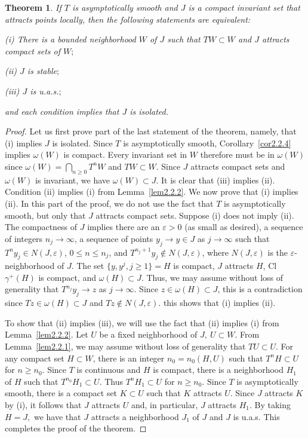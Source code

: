 \documentclass{surv-l}
\theoremstyle{plain}
\newtheorem{theorem}{Theorem}[section]
\theoremstyle{definition}
\numberwithin{equation}{section}
\numberwithin{figure}{chapter}
\begin{document}
\begin{theorem}\label{thm2.2.5} If $T$ is asymptotically smooth and $J$ is a compact invariant
set that attracts points locally, then the following statements are equivalent:

\emph{(i)} There is a bounded neighborhood $W$ of $J$ such that $TW\subset W$ and $J$ attracts compact sets of $W;$

\emph{(ii)} $J$ is stable$;$

\emph{(iii)} $J$ is u.a.s.$;$

\noindent and each condition implies that $J$ is isolated.
\end{theorem}

\begin{proof}
Let us first prove part of the last statement of the theorem, namely, that (i) implies $J$ is isolated. Since $T$ is asymptotically smooth, Corollary~\ref{cor2.2.4} implies $\omega(W)$ is compact. Every invariant set in $W$ therefore must be in $\omega(W)$ since $ \omega(W)=\bigcap_{n\geq 0}T^{n}W$ and $TW\subset W$. Since $J$ attracts compact sets and $\omega(W)$ is invariant, we have $\omega(W)\subset J$. It is clear that (iii) implies (ii). Condition (ii) implies (i) from Lemma~\ref{lem2.2.2}. We now prove that (i) implies (ii). In this part of the proof, we do not use the fact that $T$ is asymptotically smooth, but only that $J$ attracts compact sets. Suppose (i) does not imply (ii). The compactness of $J$ implies there are an $\varepsilon >0$ (as small as desired), a sequence of integers $ n_{j}\rightarrow\infty$, a sequence of points $y_{j}\rightarrow y\in J$ as $ j\rightarrow\infty$ such that $T^{n}y_{j}\in N(J, \varepsilon)$, $0\leq n\leq n_{j}$, and $T^{n_{j}+1}y_{j}\not\in N(J, \varepsilon)$, where $N(J, \varepsilon)$ is the $\varepsilon$-neighborhood of $J$. The set $\{y, y^{j}, j\geq 1\}=H$ is compact, $J$ attracts $H$, Cl $\gamma^{+}(H)$ is compact, and $\omega(H)\subset J$. Thus, we may assume without loss of generality that $T^{n_{j}}y_{j}\rightarrow z$ as $ j\rightarrow\infty$. Since $z\in\omega(H)\subset J$, this is a contradiction since $Tz\in\omega(H)\subset J$ and $Tz\not\in N(J, \varepsilon)$. this shows that (i) implies (ii).

To show that (ii) implies (iii), we will use the fact that (ii) implies (i) from Lemma~\ref{lem2.2.2}. Let $U$ be a fixed neighborhood of $J,\ U\subset W.$ From Lemma~\ref{lem2.2.1}, we may assume without loss of generality that $TU\subset U.$ For any compact set $H\subset W$, there is an integer $n_{0}=n_{0}(H, U)$ such that $T^{n}H\subset U$ for $n\geq n_{0}$. Since $T$ is continuous and $H$ is compact, there is a neighborhood $H_{1}$ of $H$ such that $T^{n_{0}}H_{1}\subset U$. Thus $T^{n}H_{1}\subset U$ for $n\geq n_{0}$. Since $T$ is asymptotically smooth, there is a compact set $K\subset U$ such that $K$ attracts $U$. Since $J$ attracts $K$ by (i), it follows that $J$ attracts $U$ and, in particular, $J$ attracts $H_{1}$. By taking $H=J,$ we have that $J$ attracts a neighborhood $J_{1}$ of $J$ and $J$ is u.a.s. This completes the proof of the theorem.
\end{proof}
\end{document}
